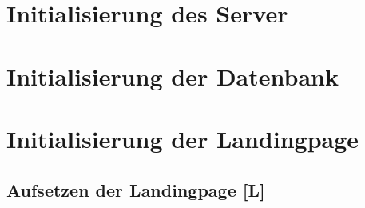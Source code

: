 \section{Initialisierung des Server}
\section{Initialisierung der Datenbank }
\section{Initialisierung der Landingpage}
\subsection{Aufsetzen der Landingpage [L]}
